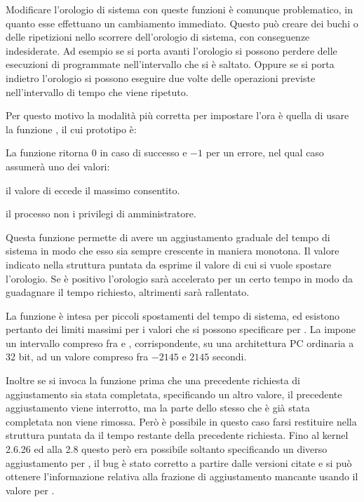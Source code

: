 
Modificare l'orologio di sistema con queste funzioni è comunque problematico,
in quanto esse effettuano un cambiamento immediato. Questo può creare dei
buchi o delle ripetizioni nello scorrere dell'orologio di sistema, con
conseguenze indesiderate.  Ad esempio se si porta avanti l'orologio si possono
perdere delle esecuzioni di  programmate nell'intervallo che si è
saltato. Oppure se si porta indietro l'orologio si possono eseguire due volte
delle operazioni previste nell'intervallo di tempo che viene ripetuto. 

Per questo motivo la modalità più corretta per impostare l'ora è quella di
usare la funzione , il cui prototipo è:

\begin{funcproto}{
}

{La funzione ritorna $0$ in caso di successo e $-1$ per un errore, nel qual
  caso  assumerà uno dei valori: 
  \begin{errlist}
  \item[\errcode{EINVAL}] il valore di  eccede il massimo
    consentito.
  \item[\errcode{EPERM}] il processo non i privilegi di amministratore.
  \end{errlist}
}  
\end{funcproto}


Questa funzione permette di avere un aggiustamento graduale del tempo di
sistema in modo che esso sia sempre crescente in maniera monotona. Il valore
indicato nella struttura  puntata da  esprime il
valore di cui si vuole spostare l'orologio. Se è positivo l'orologio sarà
accelerato per un certo tempo in modo da guadagnare il tempo richiesto,
altrimenti sarà rallentato. 

La funzione è intesa per piccoli spostamenti del tempo di sistema, ed esistono
pertanto dei limiti massimi per i valori che si possono specificare
per . La  impone un intervallo compreso fra
 e , corrispondente, su
una architettura PC ordinaria a 32 bit, ad un valore compreso fra $-2145$ e
$2145$ secondi.

Inoltre se si invoca la funzione prima che una precedente richiesta di
aggiustamento sia stata completata, specificando un altro valore, il
precedente aggiustamento viene interrotto, ma la parte dello stesso che è già
stata completata non viene rimossa. Però è possibile in questo caso farsi
restituire nella struttura puntata da  il tempo restante della
precedente richiesta. Fino al kernel 2.6.26 ed alla  2.8 questo
però era possibile soltanto specificando un diverso aggiustamento
per , il bug è stato corretto a partire dalle versioni citate e
si può ottenere l'informazione relativa alla frazione di aggiustamento
mancante usando il valore  per .

